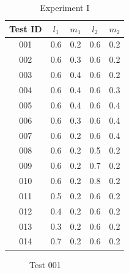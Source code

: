 \documentclass[journal]{IEEEtran}
\begin{document}
\begin{table}[!t]
\renewcommand{\arraystretch}{1.3}
\caption{Experiment I}
\label{table_001}
\centering
\begin{tabular}{|c||c|c|c|c|}
\hline
Test ID & \(l_1\) & \(m_1\) & \(l_2\) & \(m_2\) \\
\hline\hline
001 & 0.6 & 0.2 & 0.6 & 0.2 \\
002 & 0.6 & 0.3 & 0.6 & 0.2 \\
003 & 0.6 & 0.4 & 0.6 & 0.2 \\
004 & 0.6 & 0.4 & 0.6 & 0.3 \\
005 & 0.6 & 0.4 & 0.6 & 0.4 \\
006 & 0.6 & 0.3 & 0.6 & 0.4 \\
007 & 0.6 & 0.2 & 0.6 & 0.4 \\
008 & 0.6 & 0.2 & 0.5 & 0.2 \\
009 & 0.6 & 0.2 & 0.7 & 0.2 \\
010 & 0.6 & 0.2 & 0.8 & 0.2 \\
011 & 0.5 & 0.2 & 0.6 & 0.2 \\
012 & 0.4 & 0.2 & 0.6 & 0.2 \\
013 & 0.3 & 0.2 & 0.6 & 0.2 \\
014 & 0.7 & 0.2 & 0.6 & 0.2 \\
\hline
\end{tabular}
\end{table}



\begin{figure}
\centering
\caption{Test 001}
\end{figure}
\end{document}

